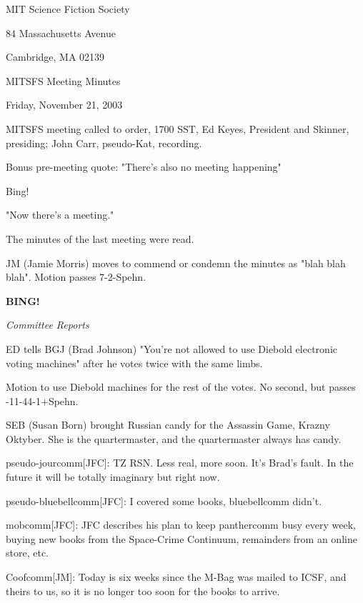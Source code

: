 \documentclass[12pt]{article}
\newcommand{\bing}{{\bf BING!} }
\newcommand{\goto}[1]{\bing \vskip 12pt \centerline{{\em{#1}}}}
\begin{document}
\begin{center}

MIT Science Fiction Society 

84 Massachusetts Avenue

Cambridge, MA 02139

\vspace{12pt}

MITSFS Meeting Minutes 

Friday, November 21, 2003

\end{center}
 
\vspace{18pt}

\setlength{\parskip}{6pt}

\noindent
MITSFS meeting called to order, 1700 SST, Ed Keyes, President and Skinner, presiding; John Carr, pseudo-Kat, recording.

Bonus pre-meeting quote: "There's also no meeting happening"

Bing!

"Now there's a meeting."

The minutes of the last meeting were read.

JM (Jamie Morris) moves to commend or condemn the minutes as "blah blah blah". Motion passes 7-2-Spehn.

\goto{Committee Reports}

ED tells BGJ (Brad Johnson) "You're not allowed to use Diebold electronic voting machines" after he votes twice with the same limbs.

Motion to use Diebold machines for the rest of the votes. No second, but passes -11-44-1+Spehn.

SEB (Susan Born) brought Russian candy for the Assassin Game, Krazny Oktyber. She is the quartermaster, and the quartermaster always has
candy.

pseudo-jourcomm[JFC]: TZ RSN. Less real, more soon.  It's Brad's fault. In the future it will be totally imaginary but right now.

pseudo-bluebellcomm[JFC]: I covered some books, bluebellcomm didn't.

mobcomm[JFC]:  JFC describes his plan to keep panthercomm busy every week, buying new books from the Space-Crime Continuum, remainders from an online store, etc.

Coofcomm[JM]: Today is six weeks since the M-Bag was mailed to ICSF, and theirs to us, so it is no longer too soon for the books to arrive.
\end{document}
